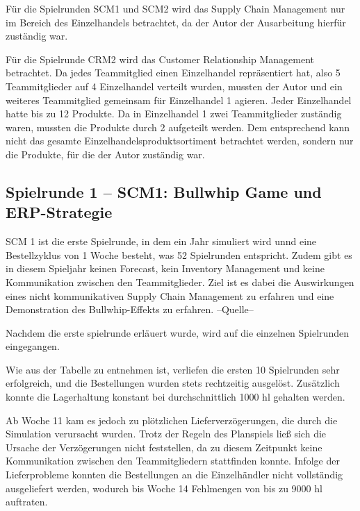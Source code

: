 \documentclass[a4paper,12pt]{article}
\begin{document}
Für die Spielrunden SCM1 und SCM2 wird das Supply Chain Management nur im Bereich des Einzelhandels betrachtet,
da der Autor der Ausarbeitung hierfür zuständig war.

Für die Spielrunde CRM2 wird das Customer Relationship Management betrachtet. Da jedes Teammitglied einen Einzelhandel repräsentiert hat, also 5 Teammitglieder auf 4 Einzelhandel verteilt wurden,
mussten der Autor und ein weiteres Teammitglied gemeinsam für Einzelhandel 1 agieren. Jeder Einzelhandel hatte bis zu 12 Produkte. Da in Einzelhandel 1 zwei Teammitglieder zuständig waren, mussten die Produkte durch 2 aufgeteilt werden.
Dem entsprechend kann nicht das gesamte Einzelhandelsproduktsortiment betrachtet werden, sondern nur die Produkte, für die der Autor zuständig war.

\subsection{Spielrunde 1 – SCM1: Bullwhip Game und ERP-Strategie}
SCM 1 ist die erste Spielrunde, in dem ein Jahr simuliert wird unnd eine Bestellzyklus von 1 Woche besteht, was 52 Spielrunden entspricht.
Zudem gibt es in diesem Spieljahr keinen Forecast, kein Inventory Management und keine Kommunikation zwischen den Teammitglieder.
Ziel ist es dabei die Auswirkungen eines nicht kommunikativen Supply Chain Management zu erfahren und eine Demonstration des Bullwhip-Effekts zu erfahren.
--Quelle--

Nachdem die  erste spielrunde erläuert wurde, wird auf die einzelnen Spielrunden eingegangen.

Wie aus der Tabelle zu entnehmen ist, verliefen die ersten 10 Spielrunden sehr erfolgreich, und die Bestellungen wurden stets rechtzeitig ausgelöst.
Zusätzlich konnte die Lagerhaltung konstant bei durchschnittlich 1000 hl gehalten werden.

Ab Woche 11 kam es jedoch zu plötzlichen Lieferverzögerungen, die durch die Simulation verursacht wurden.
Trotz der Regeln des Planspiels ließ sich die Ursache der Verzögerungen nicht feststellen, da zu diesem Zeitpunkt keine Kommunikation zwischen den Teammitgliedern stattfinden konnte.
Infolge der Lieferprobleme konnten die Bestellungen an die Einzelhändler nicht vollständig ausgeliefert werden, wodurch bis Woche 14 Fehlmengen von bis zu 9000 hl auftraten.
\end{document}
